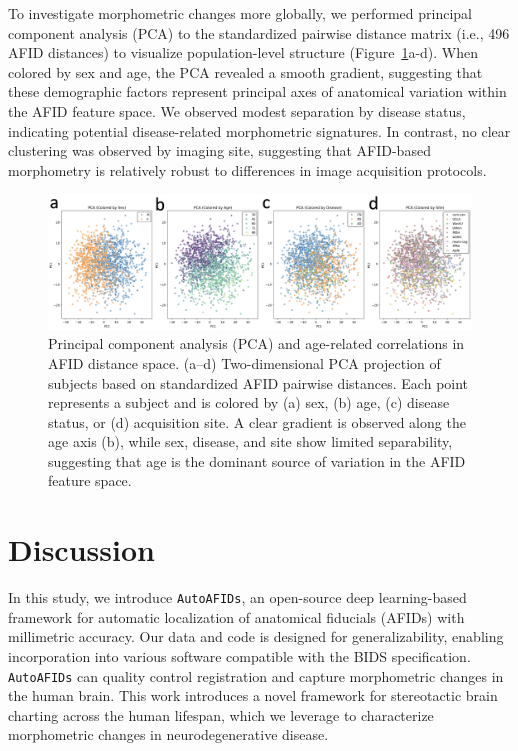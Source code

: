 To investigate morphometric changes more globally, we performed principal component analysis (PCA) to the standardized pairwise distance matrix (i.e., 496 AFID distances) to visualize population-level structure (Figure~\ref{fig:ch3_Figure_PCA}a-d). When colored by sex and age, the PCA revealed a smooth gradient, suggesting that these demographic factors represent principal axes of anatomical variation within the AFID feature space. We observed modest separation by disease status, indicating potential disease-related morphometric signatures. In contrast, no clear clustering was observed by imaging site, suggesting that AFID-based morphometry is relatively robust to differences in image acquisition protocols.
\begin{figure}[hbt!]
    \centering
    \includegraphics[width=1\linewidth]{figs/ch3_Figure_PCA.png}
    \caption{Principal component analysis (PCA) and age-related correlations in AFID distance space. (a–d) Two-dimensional PCA projection of subjects based on standardized AFID pairwise distances. Each point represents a subject and is colored by (a) sex, (b) age, (c) disease status, or (d) acquisition site. A clear gradient is observed along the age axis (b), while sex, disease, and site show limited separability, suggesting that age is the dominant source of variation in the AFID feature space.}
    \label{fig:ch3_Figure_PCA}
\end{figure}

\section{Discussion}
In this study, we introduce \texttt{AutoAFIDs}, an open-source deep learning-based framework for automatic localization of anatomical fiducials (AFIDs) with millimetric accuracy. Our data and code is designed for generalizability, enabling incorporation into various software compatible with the BIDS specification. \texttt{AutoAFIDs} can quality control registration and capture morphometric changes in the human brain. This work introduces a novel framework for stereotactic brain charting across the human lifespan, which we leverage to characterize morphometric changes in neurodegenerative disease.

